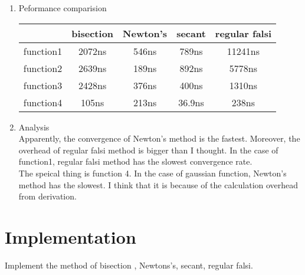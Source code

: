 \documentclass[12pt,letterpaper]{article}
\begin{document}
\begin{enumerate}
\begin{itemize}
\end{itemize}

\item Peformance comparision
\begin{center}
\begin{tabular}{ | c | c | c | c | c |}
    \hline
     &          bisection & Newton's & secant & regular falsi \\
    \hline
    function1 &  2072ns     & 546ns     & 789ns  &  11241ns \\
    function2 &  2639ns     & 189ns     & 892ns  &  5778ns  \\
    function3 &  2428ns     & 376ns     & 400ns  &  1310ns  \\
    function4 &  105ns      & 213ns     & 36.9ns &  238ns   \\
    \hline
\end{tabular}
\end{center}

\item Analysis
\\ Apparently, the convergence of Newton's method is the fastest.
Moreover, the overhead of regular falsi method is bigger than I thought. 
In the case of function1, regular falsi method has the slowest convergence rate.
\\ The speical thing is function 4. In the case of gaussian function, Newton's method has the slowest.
I think that it is because of the calculation overhead from derivation.


\end{enumerate}


\newpage
\section*{Implementation}

Implement the method of bisection , Newtons's, secant, regular falsi.
\end{document}
